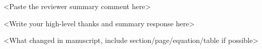 
\reviewer

\begin{generalcomment}
  <Paste the reviewer summary comment here>
\end{generalcomment}
\begin{revmeta}[]
  <Write your high-level thanks and summary response here>
\end{revmeta}

\begin{commentresponse}
  {}
  {}
  {\begin{changes}
    <What changed in manuscript, include section/page/equation/table if possible>
  \end{changes}}
\end{commentresponse}

